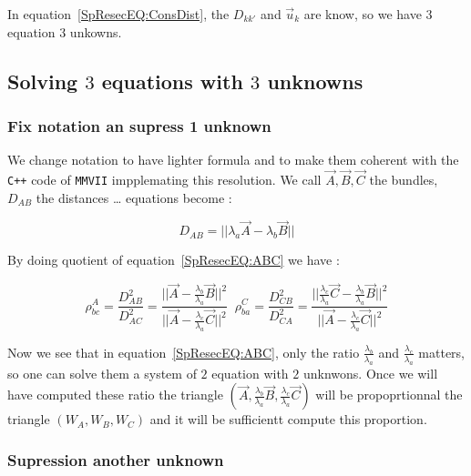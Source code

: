 In equation~\ref{SpResecEQ:ConsDist}, the $D_{kk'}$ and  $\Vec{u}_k$ are know, so we have $3$ equation 
$3$ unkowns.




\subsection{Solving $3$  equations with $3$ unknowns}

\subsubsection{Fix notation an supress 1 unknown}

We change notation to have lighter formula and to make them coherent with the {\tt C++} code of {\tt MMVII}
impplemating this resolution. We call $\Vec{A} , \Vec{B}, \Vec{C}$  the bundles, $D_{AB}$ the distances \dots
equations become :

\begin{equation}
	D_{AB} = || \lambda_a \Vec{A} -  \lambda_{b} \Vec{B} || \label{SpResecEQ:ABC}
\end{equation}

By doing quotient of equation~\ref{SpResecEQ:ABC} we have :

\begin{equation}
	\rho^A_{bc}  
	=	\frac{D^2_{AB}}{D^2_{AC}} 
	= \frac{|| \Vec{A} -  \frac{\lambda_{b}}{\lambda_{a}} \Vec{B} ||^2 }{||\Vec{A} -  \frac{\lambda_{c}}{\lambda_{a}} \Vec{C}||^2}
	\;\;
	\rho^C_{ba}  
	=	\frac{D^2_{CB}}{D^2_{CA}} 
	= \frac{|| \frac{\lambda_{c}}{\lambda_{a}} \Vec{C} -  \frac{\lambda_{b}}{\lambda_{a}} \Vec{B} ||^2 }
	       {||\Vec{A} -  \frac{\lambda_{c}}{\lambda_{a}} \Vec{C}||^2}
	       \label{SpResecEQ:ABC}
\end{equation}

Now we see that in equation~\ref{SpResecEQ:ABC}, only the ratio $\frac{\lambda_{b}}{\lambda_{a}}$ and $\frac{\lambda_{c}}{\lambda_{a}}$
matters, so one can solve them a system of $2$ equation with $2$ unknwons. Once we will have computed these ratio the triangle
$(\Vec{A} , \frac{\lambda_{b}}{\lambda_{a}} \Vec{B},  \frac{\lambda_{c}}{\lambda_{a}} \Vec{C})$ will be propoprtionnal the
triangle $(W_A,W_B,W_C)$ and it will be sufficientt compute this proportion.


\subsubsection{Supression another unknown}

